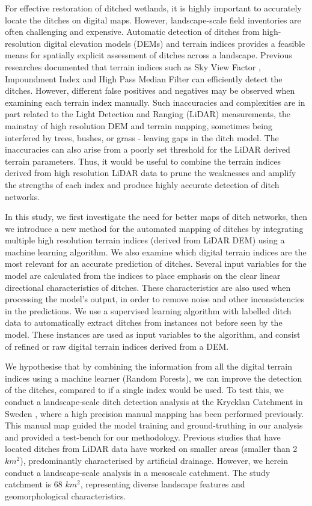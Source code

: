 \documentclass[]{interact}
\theoremstyle{plain}%
\theoremstyle{definition}
\theoremstyle{remark}
\begin{document}
For effective restoration of ditched wetlands, it is highly important  to accurately locate the ditches on digital maps. However, landscape-scale field inventories are often challenging and expensive. Automatic detection of ditches from high-resolution digital elevation models (DEMs) and terrain indices provides a feasible means for spatially explicit assessment of ditches across a landscape. Previous researches  \citep{uppsala} documented  that terrain indices such as Sky View Factor \citep{zaksek}, Impoundment Index \citep{whiteboxtools} and High Pass Median Filter \citep{whiteboxtools} can efficiently  detect the ditches. However, different false positives and negatives may be observed when examining each terrain index manually. Such inaccuracies and complexities are in part related to the Light Detection and Ranging (LiDAR) measurements, the mainstay of high resolution DEM and terrain mapping, sometimes being interfered by trees, bushes, or grass - leaving gaps in the ditch model. The inaccuracies can also arise from a poorly set threshold for the LiDAR derived terrain parameters. Thus, it would be useful to combine the terrain indices derived from high resolution LiDAR data to prune the weaknesses and amplify the strengths of each index and produce highly accurate detection of ditch networks.

In this study, we first investigate the need for better maps of ditch networks, then we introduce a new method for the automated mapping of ditches by integrating multiple high resolution terrain indices (derived from LiDAR DEM) using a machine learning algorithm. We also examine which digital terrain indices are the most relevant for an accurate prediction of ditches. Several input variables for the model are calculated from the indices to place emphasis on the clear linear directional characteristics of ditches. These characteristics are also used when processing the model's output, in order to remove noise and other inconsistencies in the predictions. We use a supervised learning algorithm with labelled ditch data to automatically extract ditches from instances not before seen by the model. These instances are used as input variables to the algorithm, and consist of refined or raw digital terrain indices derived from a DEM.

We hypothesise that by combining the information from all the digital terrain indices using a machine learner (Random Forests), we can improve the detection of the ditches, compared to if a single index would be used. To test this, we conduct a landscape-scale ditch detection analysis at the Krycklan Catchment in Sweden \citep{krycklancatchment}, where a high precision manual mapping has been performed previously. This manual map guided the model training and ground-truthing in our analysis and provided a test-bench for our methodology. Previous studies \citep{roelens, bailly, rapinel, kiss} that have located ditches from LiDAR data have worked on smaller areas (smaller than 2 $km^2$), predominantly characterised by artificial drainage. However, we herein conduct a landscape-scale analysis in a mesoscale catchment. The study  catchment  is 68 $km^2$, representing diverse landscape features and geomorphological characteristics.
\end{document}
